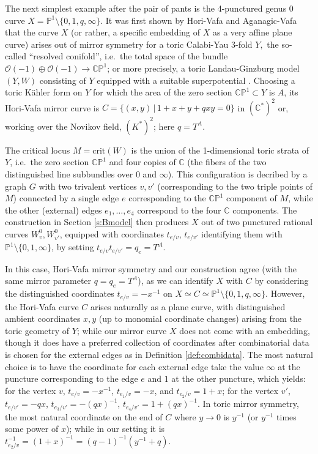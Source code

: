 \documentclass[11pt,leqno]{amsart}
\numberwithin{equation}{section}
\def\CP{\mathbb{CP}}
\def\C{\mathbb{C}}
\def\O{{\mathcal O}}
\def\PP{{\mathbb P}}
\begin{document}
The next simplest example after the pair of pants is the 4-punctured genus
0 curve $X=\PP^1\setminus \{0,1,q,\infty\}$. It was first shown by
Hori-Vafa \cite{HoriVafa} and Aganagic-Vafa \cite{AV} that the curve $X$ (or rather, a specific embedding
of $X$ as a very affine plane curve) arises out of mirror symmetry
for a toric Calabi-Yau 3-fold $Y,$ the so-called ``resolved conifold'',
i.e.\ the total space of the bundle $\O(-1)\oplus\O(-1)\to \CP^1$;
or more precisely, a toric Landau-Ginzburg model $(Y,W)$
consisting of $Y$ equipped with a suitable superpotential \cite{ChanLauLeung,AAK}.
Choosing a toric K\"ahler form on $Y$ for which the area of the zero section $\CP^1\subset Y$
is $A$, its Hori-Vafa mirror curve is 
$C=\{(x,y)\,|\,1+x+y+qxy=0\}$ in $(\C^*)^2$ or,
working over the Novikov field, $(K^*)^2$; here $q=T^A$.

The critical locus $M=\mathrm{crit}(W)$ is the union of the 1-dimensional toric strata of $Y$, i.e.\
the zero section $\CP^1$ and four copies of $\C$ (the fibers of
the two distinguished line subbundles over $0$ and $\infty$). 
This configuration is decribed by a graph $G$ with two trivalent vertices
$v,v'$ (corresponding to the two triple points of $M$) connected by a single
edge $e$ corresponding to the $\CP^1$ component of $M$, while the other
(external) edges $e_1,\dots,e_4$ correspond to the four $\C$ components.
The construction in Section \ref{s:Bmodel} then produces $X$
out of two punctured rational curves $W^0_v,W^0_{v'}$, equipped with
coordinates $t_{e/v}$, $t_{e/v'}$ identifying them with 
$\PP^1\setminus \{0,1,\infty\}$, by setting
$t_{e/v}t_{e/v'}=q_e=T^A$.

In this case, Hori-Vafa mirror symmetry and our construction agree (with
the same mirror parameter $q=q_e=T^A$), as we can identify $X$ with $C$ by
considering the distinguished coordinates $t_{e/v}=-x^{-1}$ on $
X\simeq C\simeq \PP^1\setminus
\{0,1,q,\infty\}$. However, the Hori-Vafa curve $C$ arises naturally 
as a plane curve, with distinguished ambient coordinates $x,y$ (up to
monomial coordinate changes) arising from the toric geometry of $Y$; while
our mirror curve $X$ does not come with an embedding, though it does have a
preferred collection of coordinates after combinatorial data is chosen for
the external edges as
in Definition \ref{def:combidata}. The most natural choice is to have
the coordinate for each
external edge take the value $\infty$ at the puncture corresponding
to the edge $e$ and $1$ at the other puncture, which yields: for the
vertex $v$, $t_{e/v}=-x^{-1}$, $t_{e_1/v}=-x$, and $t_{e_2/v}=1+x$;
for the vertex $v'$, $t_{e/v'}=-qx$, $t_{e_3/v'}=-(qx)^{-1}$, $t_{e_4/v'}=
1+(qx)^{-1}$. In toric mirror symmetry, the most natural
coordinate on the end of $C$ where $y\to 0$ is $y^{-1}$ (or $y^{-1}$ times
some power of $x$); while in our setting it is
$t_{e_2/v}^{-1}=(1+x)^{-1}=(q-1)^{-1} (y^{-1}+q)$.
\end{document}
